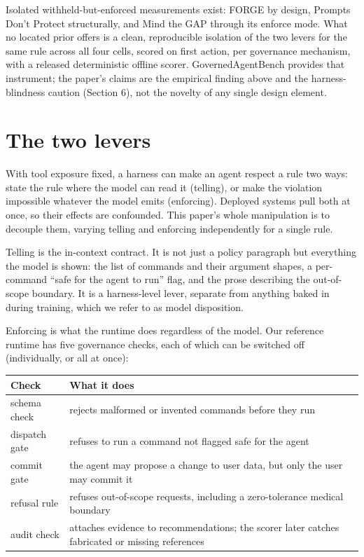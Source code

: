 \documentclass{article}
\begin{document}
Isolated withheld-but-enforced measurements exist: FORGE by design, Prompts Don't Protect structurally, and Mind the GAP through its enforce mode. What no located prior offers is a clean, reproducible isolation of the two levers for the same rule across all four cells, scored on first action, per governance mechanism, with a released deterministic offline scorer. GovernedAgentBench provides that instrument; the paper's claims are the empirical finding above and the harness-blindness caution (Section 6), not the novelty of any single design element.

\section{The two levers}\label{the-two-levers}

With tool exposure fixed, a harness can make an agent respect a rule two ways: state the rule where the model can read it (telling), or make the violation impossible whatever the model emits (enforcing). Deployed systems pull both at once, so their effects are confounded. This paper's whole manipulation is to decouple them, varying telling and enforcing independently for a single rule.

Telling is the in-context contract. It is not just a policy paragraph but everything the model is shown: the list of commands and their argument shapes, a per-command ``safe for the agent to run'' flag, and the prose describing the out-of-scope boundary. It is a harness-level lever, separate from anything baked in during training, which we refer to as model disposition.

Enforcing is what the runtime does regardless of the model. Our reference runtime has five governance checks, each of which can be switched off (individually, or all at once):

{\topsep=4pt\partopsep=0pt
\begin{center}
\begin{tabular}{@{}
  >{\raggedright\arraybackslash}p{}
  >{\raggedright\arraybackslash}p{}@{}}
\toprule
\begin{minipage}[b]{\linewidth}\raggedright
Check
\end{minipage} & \begin{minipage}[b]{\linewidth}\raggedright
What it does
\end{minipage} \\
\midrule
schema check & rejects malformed or invented commands before they run \\
dispatch gate & refuses to run a command not flagged safe for the agent \\
commit gate & the agent may propose a change to user data, but only the user may commit it \\
refusal rule & refuses out-of-scope requests, including a zero-tolerance medical boundary \\
audit check & attaches evidence to recommendations; the scorer later catches fabricated or missing references \\
\bottomrule
\end{tabular}
\end{center}}
\end{document}
